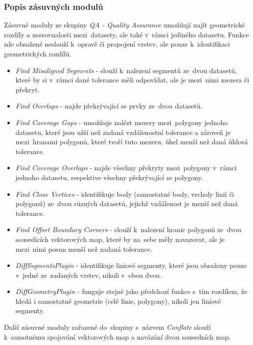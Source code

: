 \subsubsection{Popis zásuvných modulů}

Zásuvné moduly ze skupiny \textit{QA - Quality Assurance} umožňují najít geometrické rozdíly a nesrovnalosti mezi~datasety, ale také v~rámci jediného datasetu. Funkce zde
obsažené neslouží k~opravě či propojení vrstev, ale pouze k~identifikaci geometrických rozdílů.

\begin{itemize}
 \item \textit{Find Misaligned Segments} - slouží k~nalezení segmentů ze~dvou datasetů, které by si v~rámci dané tolerance měli odpovídat, ale je mezi~nimi mezera či překryt. 
 \item \textit{Find Overlaps} - najde překrývající se prvky ze~dvou datasetů.
 \item \textit{Find Coverage Gaps} - umožňuje nalézt mezery mezi~polygony jednoho datasetu, které jsou užší než zadaná vzdálenostní tolerance a zároveň je mezi~hranami polygonů,
	které tvoří tuto mezeru, úhel menší než daná úhlová tolerance.
 \item \textit{Find Coverage Overlaps} - najde všechny překryty mezi~polygony v~rámci jednoho datasetu, respektive všechny překrývající se polygony.
 \item \textit{Find Close Vertices} - identifikuje body (samostatné body, vrcholy linií či polygonů) ze~dvou různých datasetů, jejichž vzdálenost je menší než daná tolerance.
 \item \textit{Find Offset Boundary Corners} - slouží k~nalezení hranic polygonů ze~dvou sousedících vektorových map, které by na~sebe měly navazovat, ale je mezi~nimi posun
	menší než zadaná tolerance.
 \item \textit{DiffSegmentsPlugin} - identifikuje liniové segmenty, které jsou obsaženy pouze v~jedné ze~zadaných vrstev, nikoli v~obou dvou.
 \item \textit{DiffGeometryPlugin} - funguje stejně jako předchozí funkce s~tím rozdílem, že hledá i samostatné geometrie (celé linie, polygony), nikoli jen liniové segmenty.
\end{itemize}

Další zásuvné moduly zařazené do~skupiny s~názvem \textit{Conflate} slouží k~samotnému spojování vektorových map a navázání dvou sousedních map.


